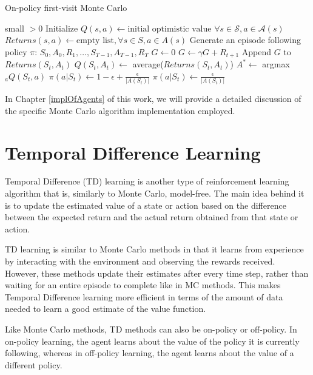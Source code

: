 \begin{algorithm}
\caption{On-policy first-visit Monte Carlo}\label{algo:MC}
\begin{algorithmic}[1]
\Require small $>0$
\State Initialize
\State $Q(s,a) \gets \text{initial optimistic value } \forall s\in \mathcal{S}, a\in \mathcal{A}(s)$
\State $Returns(s,a) \gets \text{empty list}, \forall s\in S, a\in A(s)$
\Repeat
\State Generate an episode following policy $\pi$: $S_0, A_0, R_1,\dots, S_{T-1}, A_{T-1}, R_T$
\State $G \gets 0$
\State $G \gets \gamma G + R_{t+1}$
\State Append $G$ to $Returns(S_t, A_t)$
\State $Q(S_t, A_t) \gets$ average($Returns(S_t, A_t)$)
\State $A^* \gets$ argmax$_a Q(S_t, a)$ 
\State $\pi(a|S_t) \gets 1 - \epsilon + \frac{\epsilon}{|A(S_t)|}$
\Else
\State $\pi(a|S_t) \gets \frac{\epsilon}{|A(S_t)|}$
\EndIf
\EndFor
\EndIf
\EndFor
{}
\end{algorithmic}
\end{algorithm}

In Chapter \ref{implOfAgents} of this work, we will provide a detailed discussion of the specific Monte Carlo algorithm implementation employed.

\section{Temporal Difference Learning}
Temporal Difference (TD) learning is another type of reinforcement learning algorithm that is, similarly to Monte Carlo, model-free. The main idea behind it is to update the estimated value of a state or action based on the difference between the expected return and the actual return obtained from that state or action. 

TD learning is similar to Monte Carlo methods in that it learns from experience by interacting with the environment and observing the rewards received. However, these methods update their estimates after every time step, rather than waiting for an entire episode to complete like in MC methods. This makes Temporal Difference learning more efficient in terms of the amount of data needed to learn a good estimate of the value function.

Like Monte Carlo methods, TD methods can also be on-policy or off-policy. In on-policy learning, the agent learns about the value of the policy it is currently following, whereas in off-policy learning, the agent learns about the value of a different policy. 

